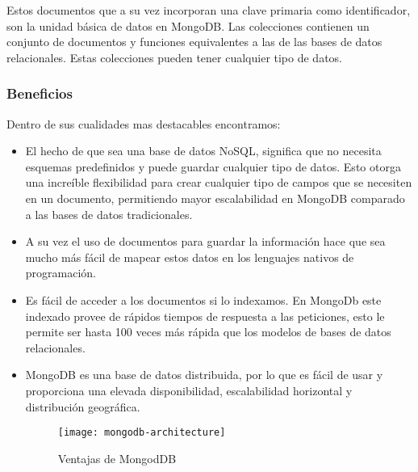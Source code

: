 Estos documentos que a su vez incorporan una clave primaria como identificador, son la unidad básica de datos en MongoDB. Las colecciones contienen un conjunto de documentos y funciones equivalentes a las de las bases de datos relacionales. Estas colecciones pueden tener cualquier tipo de datos.


\subsubsection{ Beneficios }

Dentro de sus cualidades mas destacables encontramos:

\begin{itemize}
	
	\item El hecho de que sea una base de datos NoSQL, significa que no necesita esquemas predefinidos y puede guardar cualquier tipo de datos. Esto otorga una increíble flexibilidad para crear cualquier tipo de campos que se necesiten en un documento, permitiendo mayor escalabilidad en MongoDB comparado a las bases de datos tradicionales.

	\item A su vez el uso de documentos para guardar la información hace que sea mucho más fácil de mapear estos datos en los lenguajes nativos de programación.

	\item Es fácil de acceder a los documentos si lo indexamos. En MongoDb este indexado provee de rápidos tiempos de respuesta a las peticiones, esto le permite ser hasta 100 veces más rápida que los modelos de bases de datos relacionales.

	\item MongoDB es una base de datos distribuida, por lo que es fácil de usar y proporciona una elevada disponibilidad, escalabilidad horizontal y distribución geográfica.
	
	\begin{figure}[h]
		\centering
		\texttt{[image: mongodb-architecture]}
		\caption{ Ventajas de MongodDB  }
		\label{fig:mongoDBarquitectura}
	\end{figure}


\end{itemize}

